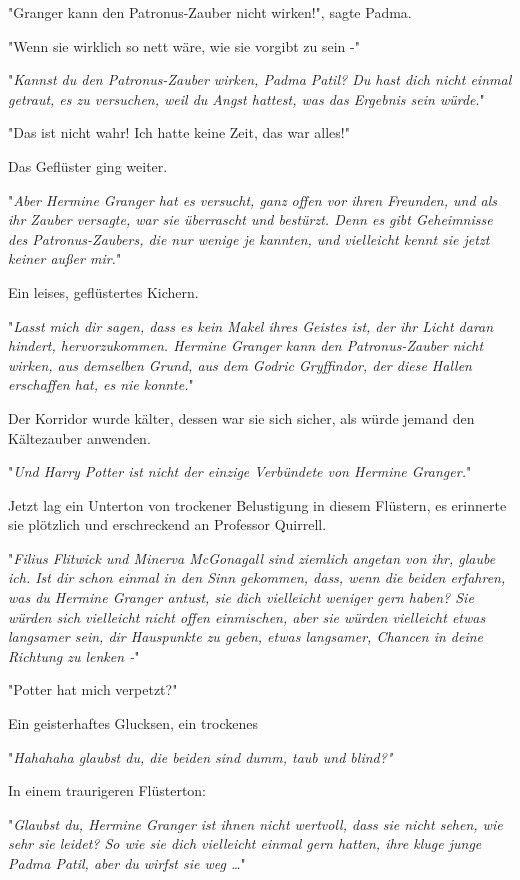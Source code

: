 {"Granger kann den Patronus-Zauber nicht wirken!", sagte Padma.

"Wenn sie wirklich so nett wäre, wie sie vorgibt zu sein -"

"\emph{Kannst du den Patronus-Zauber wirken, Padma Patil? Du hast dich nicht einmal getraut, es zu versuchen, weil du Angst hattest, was das Ergebnis sein würde}."

"Das ist nicht wahr! Ich hatte keine Zeit, das war alles!"

Das Geflüster ging weiter.

"\emph{Aber Hermine Granger hat es versucht, ganz offen vor ihren Freunden, und als ihr Zauber versagte, war sie überrascht und bestürzt. Denn es gibt Geheimnisse des Patronus-Zaubers, die nur wenige je kannten, und vielleicht kennt sie jetzt keiner außer mir.}"

Ein leises, geflüstertes Kichern.

"\emph{Lasst mich dir sagen, dass es kein Makel ihres Geistes ist, der ihr Licht daran hindert, hervorzukommen. Hermine Granger kann den Patronus-Zauber nicht wirken, aus demselben Grund, aus dem Godric Gryffindor, der diese Hallen erschaffen hat, es nie konnte.}"

Der Korridor wurde kälter, dessen war sie sich sicher, als würde jemand den Kältezauber anwenden.

"\emph{Und Harry Potter ist nicht der einzige Verbündete von Hermine Granger.}"

Jetzt lag ein Unterton von trockener Belustigung in diesem Flüstern, es erinnerte sie plötzlich und erschreckend an Professor Quirrell.

"\emph{Filius Flitwick und Minerva McGonagall sind ziemlich angetan von ihr, glaube ich. Ist dir schon einmal in den Sinn gekommen, dass, wenn die beiden erfahren, was du Hermine Granger antust, sie dich vielleicht weniger gern haben? Sie würden sich vielleicht nicht offen einmischen, aber sie würden vielleicht etwas langsamer sein, dir Hauspunkte zu geben, etwas langsamer, Chancen in deine Richtung zu lenken -}"

"Potter hat mich verpetzt?"

Ein geisterhaftes Glucksen, ein trockenes

"\emph{Hahahaha glaubst du, die beiden sind dumm, taub und blind?"}

In einem traurigeren Flüsterton:

"\emph{Glaubst du, Hermine Granger ist ihnen nicht wertvoll, dass sie nicht sehen, wie sehr sie leidet? So wie sie dich vielleicht einmal gern hatten, ihre kluge junge Padma Patil, aber du wirfst sie weg …}"

}
